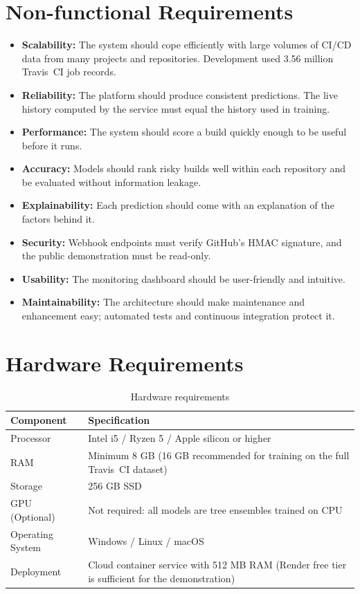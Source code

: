 \section{Non-functional Requirements}
\label{sec:nonfunctional}
\begin{itemize}
\item \textbf{Scalability:} The system should cope efficiently with large volumes of CI/CD data from many projects and repositories. Development used 3.56 million Travis~CI job records.
\item \textbf{Reliability:} The platform should produce consistent predictions. The live history computed by the service must equal the history used in training.
\item \textbf{Performance:} The system should score a build quickly enough to be useful before it runs.
\item \textbf{Accuracy:} Models should rank risky builds well within each repository and be evaluated without information leakage.
\item \textbf{Explainability:} Each prediction should come with an explanation of the factors behind it.
\item \textbf{Security:} Webhook endpoints must verify GitHub's HMAC signature, and the public demonstration must be read-only.
\item \textbf{Usability:} The monitoring dashboard should be user-friendly and intuitive.
\item \textbf{Maintainability:} The architecture should make maintenance and enhancement easy; automated tests and continuous integration protect it.
\end{itemize}

\section{Hardware Requirements}
\label{sec:hardware}
\begin{table}[H]
\centering
\caption{Hardware requirements}
\label{tab:hw}
\begin{tabular}{|p{4cm}|p{9cm}|}
\hline
\textbf{Component} & \textbf{Specification}\\ \hline
Processor & Intel i5 / Ryzen 5 / Apple silicon or higher\\ \hline
RAM & Minimum 8 GB (16 GB recommended for training on the full Travis~CI dataset)\\ \hline
Storage & 256 GB SSD\\ \hline
GPU (Optional) & Not required: all models are tree ensembles trained on CPU\\ \hline
Operating System & Windows / Linux / macOS\\ \hline
Deployment & Cloud container service with 512 MB RAM (Render free tier is sufficient for the demonstration)\\ \hline
\end{tabular}
\end{table}

